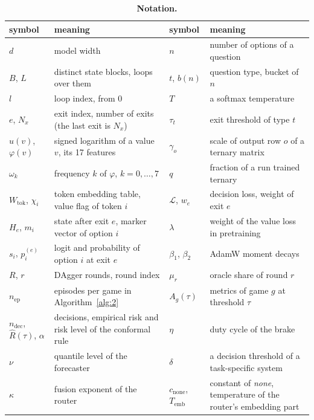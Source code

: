 \documentclass[10pt]{article}
\begin{document}
\begin{table}[tbp]
\centering
\small
\caption*{\textbf{Notation.}}
\setlength{\tabcolsep}{4pt}
\begin{tabular}{@{}>{\raggedright\arraybackslash}p{2.1cm}>{\raggedright\arraybackslash}p{4.9cm}>{\raggedright\arraybackslash}p{2.3cm}>{\raggedright\arraybackslash}p{4.9cm}@{}}
\toprule
symbol & meaning & symbol & meaning \\
\midrule
$d$ & model width & $n$ & number of options of a question \\
$B$, $L$ & distinct state blocks, loops over them & $t$, $b(n)$ & question type, bucket of $n$ \\
$l$ & loop index, from 0 & $T$ & a softmax temperature \\
$e$, $N_x$ & exit index, number of exits (the last exit is $N_x$) & $\tau_t$ & exit threshold of type $t$ \\
$u(v)$, $\varphi(v)$ & signed logarithm of a value $v$, its 17 features & $\gamma_o$ & scale of output row $o$ of a ternary matrix \\
$\omega_k$ & frequency $k$ of $\varphi$, $k = 0, \dots, 7$ & $q$ & fraction of a run trained ternary \\
$W_{\mathrm{tok}}$, $\chi_i$ & token embedding table, value flag of token $i$ & $\mathcal{L}$, $w_e$ & decision loss, weight of exit $e$ \\
$H_e$, $m_i$ & state after exit $e$, marker vector of option $i$ & $\lambda$ & weight of the value loss in pretraining \\
$s_i$, $p^{(e)}_i$ & logit and probability of option $i$ at exit $e$ & $\beta_1$, $\beta_2$ & AdamW moment decays \\
$R$, $r$ & DAgger rounds, round index & $\mu_r$ & oracle share of round $r$ \\
$n_{\mathrm{ep}}$ & episodes per game in Algorithm~\ref{alg:2} & $A_g(\tau)$ & metrics of game $g$ at threshold $\tau$ \\
$n_{\mathrm{dec}}$, $\hat R(\tau)$, $\alpha$ & decisions, empirical risk and risk level of the conformal rule & $\eta$ & duty cycle of the brake \\
$\nu$ & quantile level of the forecaster & $\delta$ & a decision threshold of a task-specific system \\
$\kappa$ & fusion exponent of the router & $c_{\mathrm{none}}$, $T_{\mathrm{emb}}$ & constant of \emph{none}, temperature of the router's embedding part \\
\bottomrule
\end{tabular}
\end{table}
\end{document}
